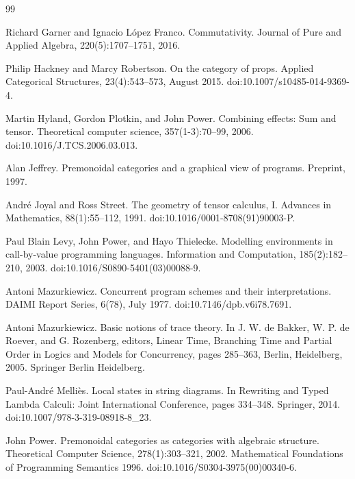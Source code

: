 \begin{thebibliography}{99}
\par\noindent    Richard Garner and Ignacio López Franco.  Commutativity.  Journal of Pure and Applied Algebra, 220(5):1707--1751, 2016.  

\par\noindent    Philip Hackney and Marcy Robertson.  On the category of props.  Applied Categorical Structures, 23(4):543--573, August 2015.  doi:10.1007/s10485-014-9369-4.  

\par\noindent    Martin Hyland, Gordon Plotkin, and John Power.  Combining effects: Sum and tensor.  Theoretical computer science, 357(1-3):70--99, 2006.  doi:10.1016/J.TCS.2006.03.013.  

\par\noindent    Alan Jeffrey.  Premonoidal categories and a graphical view of programs.  Preprint, 1997.  

\par\noindent    André Joyal and Ross Street.  The geometry of tensor calculus, I.  Advances in Mathematics, 88(1):55--112, 1991.  doi:10.1016/0001-8708(91)90003-P.  

\par\noindent    Paul Blain Levy, John Power, and Hayo Thielecke.  Modelling environments in call-by-value programming languages.  Information and Computation, 185(2):182--210, 2003.  doi:10.1016/S0890-5401(03)00088-9.  

\par\noindent    Antoni Mazurkiewicz.  Concurrent program schemes and their interpretations.  DAIMI Report Series, 6(78), July 1977.  doi:10.7146/dpb.v6i78.7691.  

\par\noindent    Antoni Mazurkiewicz.  Basic notions of trace theory.  In J. W. de Bakker, W. P. de Roever, and G. Rozenberg, editors, Linear Time, Branching Time and Partial Order in Logics and Models for Concurrency, pages 285--363, Berlin, Heidelberg, 2005. Springer Berlin Heidelberg.  

\par\noindent    Paul-André Melliès.  Local states in string diagrams.  In Rewriting and Typed Lambda Calculi: Joint International Conference, pages 334--348. Springer, 2014.  doi:10.1007/978-3-319-08918-8\_23.  

\par\noindent    John Power.  Premonoidal categories as categories with algebraic structure.  Theoretical Computer Science, 278(1):303--321, 2002.  Mathematical Foundations of Programming Semantics 1996.  doi:10.1016/S0304-3975(00)00340-6.  


\end{thebibliography}
